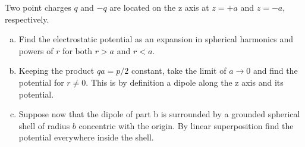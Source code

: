 \documentclass{article}
\begin{document}
\setcounter{problem}{5}
\begin{problem}\label{problem3.6}
Two point charges $q$ and $-q$ are located on the z axis at $z = +a$ and $z = -a$, respectively.
\begin{enumerate}[(a)]
\item Find the electrostatic potential as an expansion in spherical harmonics and powers of $r$ for both $r > a$ and $r < a$.
\item Keeping the product $qa = p/2$ constant, take the limit of $a \to 0$ and find the potential for $r \ne 0$. This is by definition a dipole along the z axis and its potential.
\item Suppose now that the dipole of part b is surrounded by a grounded spherical shell of radius $b$ concentric with the origin. By linear superposition find the potential everywhere inside the shell.
\end{enumerate}
\end{problem}
\end{document}
